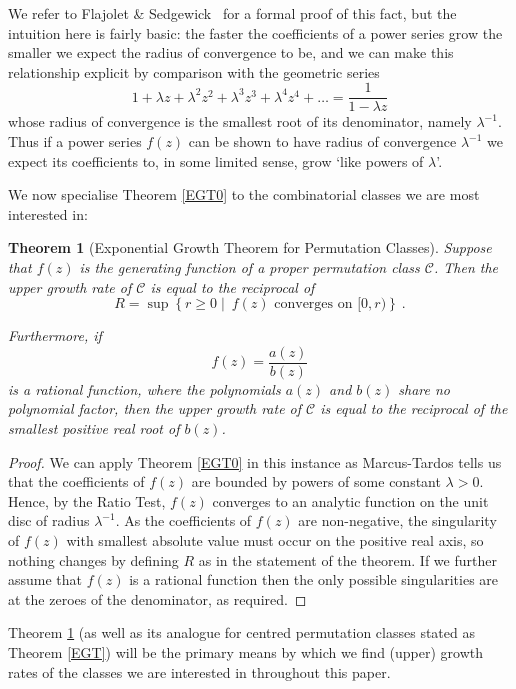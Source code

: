 \documentclass[11pt,a4paper]{article}
\newtheorem{thm}{Theorem}[section]
\theoremstyle{definition}
\begin{document}
We refer to Flajolet \& Sedgewick~\cite[Theorem IV.7]{flajolet:analytic-combin:} for a formal proof of this fact, but the intuition here is fairly basic: the faster the coefficients of a power series grow the smaller we expect the radius of convergence to be, and we can make this relationship explicit by comparison with the geometric series
\[
1 + \lambda z + \lambda^{2}z^{2} + \lambda^{3}z^{3} + \lambda^{4}z^{4} + \dots = \frac{1}{1 - \lambda z}
\]
whose radius of convergence is the smallest root of its denominator, namely $\lambda^{-1}$. Thus if a power series $f(z)$ can be shown to have radius of convergence $\lambda^{-1}$ we expect its coefficients to, in some limited sense, grow `like powers of $\lambda$'.

We now specialise Theorem \ref{EGT0} to the combinatorial classes we are most interested in:

\begin{thm}[Exponential Growth Theorem for Permutation Classes]\label{EGT1}
Suppose that $f(z)$ is the generating function of a proper permutation class $\mathcal{C}$. Then the upper growth rate of $\mathcal{C}$ is equal to the reciprocal of 
\[
R = \sup\left\{r \geq 0 \mid \ \text{$f(z)$ converges on $[0,r)$}\right\} \ .
\]

Furthermore, if
\[
f(z) = \frac{a(z)}{b(z)}
\]
is a rational function, where the polynomials $a(z)$ and $b(z)$ share no polynomial factor, then the upper growth rate of $\mathcal{C}$ is equal to the reciprocal of the smallest positive real root of $b(z)$.
\end{thm}

\begin{proof}
We can apply Theorem \ref{EGT0} in this instance as Marcus-Tardos tells us that the coefficients of $f(z)$ are bounded by powers of some constant $\lambda > 0$. Hence, by the Ratio Test, $f(z)$ converges to an analytic function on the unit disc of radius $\lambda^{-1}$. As the coefficients of $f(z)$ are non-negative, the singularity of $f(z)$ with smallest absolute value must occur on the positive real axis, so nothing changes by defining $R$ as in the statement of the theorem. If we further assume that $f(z)$ is a rational function then the only possible singularities are at the zeroes of the denominator, as required. \qedhere
\end{proof}

Theorem \ref{EGT1} (as well as its analogue for centred permutation classes stated as Theorem \ref{EGT}) will be the primary means by which we find (upper) growth rates of the classes we are interested in throughout this paper.
\end{document}
